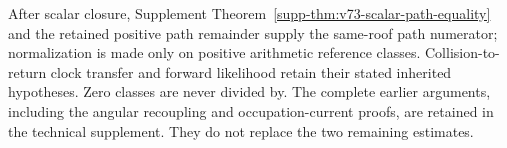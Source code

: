 \documentclass[11pt,reqno]{amsart}
\numberwithin{equation}{section}
\theoremstyle{definition}
\theoremstyle{remark}\newtheorem{remark}[theorem]{Remark}
\begin{document}
After scalar closure, Supplement Theorem~\ref{supp-thm:v73-scalar-path-equality}
and the retained positive path remainder supply the
same-roof path numerator; normalization is made only on positive
arithmetic reference classes. Collision-to-return clock transfer and
forward likelihood retain their stated inherited hypotheses. Zero
classes are never divided by. The complete earlier arguments, including
the angular recoupling and occupation-current proofs, are retained in
the technical supplement. They do not replace the two remaining estimates.


\end{document}
